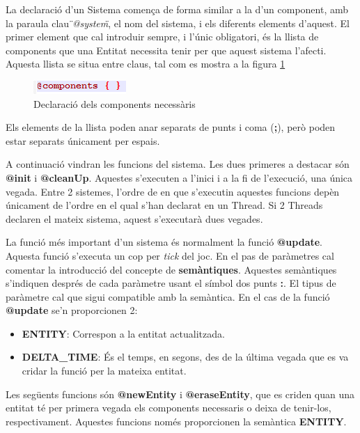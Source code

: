 La declaració d'un Sistema comença de forma similar a la d'un component, amb la paraula clau {\em \"{}@system\"{}}, el nom del sistema, i els diferents elements d'aquest. El primer element que cal introduir sempre, i l'únic obligatori, és la llista de components que una Entitat necessita tenir per que aquest sistema l'afecti. Aquesta llista se situa entre claus, tal com es mostra a la figura \ref{fig:ExempleSystem2}


\begin{figure}[h!]
  \includegraphics{./img/ExempleSystem2.png}
  \caption{Declaració dels components necessàris \label{fig:ExempleSystem2}}
\end{figure}

Els elements de la llista poden anar separats de punts i coma ({\bf ;}), però poden estar separats únicament per espais.

A continuació vindran les funcions del sistema. Les dues primeres a destacar són {\bf @init} i {\bf @cleanUp}. Aquestes s'executen a l'inici i a la fi de l'execució, una única vegada. Entre 2 sistemes, l'ordre de en que s'executin aquestes funcions depèn únicament de l'ordre en el qual s'han declarat en un Thread. Si 2 Threads declaren el mateix sistema, aquest s'executarà dues vegades.

La funció més important d'un sistema és normalment la funció {\bf @update}. Aquesta funció s'executa un cop per {\em tick} del joc. En el pas de paràmetres cal comentar la introducció del concepte de {\bf semàntiques}. Aquestes semàntiques s'indiquen després de cada paràmetre usant el símbol dos punts {\bf :}. El tipus de paràmetre cal que sigui compatible amb la semàntica. En el cas de la funció {\bf @update} se'n proporcionen 2:

\begin{itemize}
  \item {\bf ENTITY}: Correspon a la entitat actualitzada.
  \item {\bf DELTA\_TIME}: És el temps, en segons, des de la última vegada que es va cridar la funció per la mateixa entitat.
\end{itemize}

Les següents funcions són {\bf @newEntity} i {\bf @eraseEntity}, que es criden quan una entitat té per primera vegada els components necessaris o deixa de tenir-los, respectivament. Aquestes funcions només proporcionen la semàntica {\bf ENTITY}.

